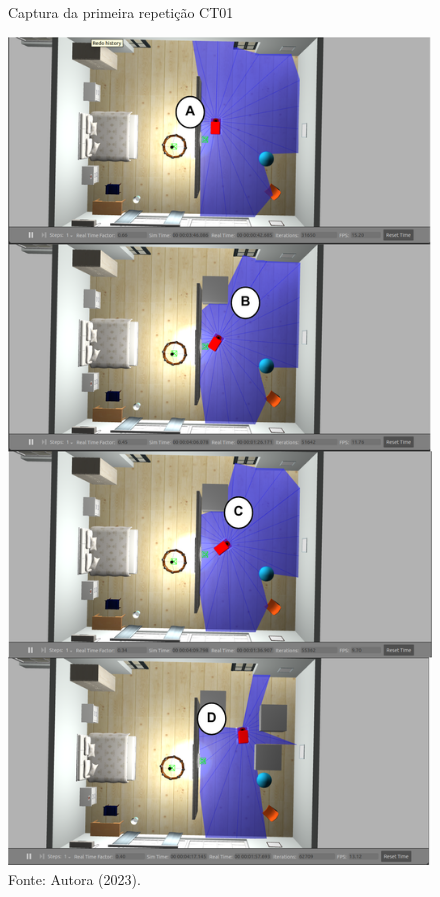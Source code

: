 \begin{figure}[H]
    \centering
    \caption{Captura da primeira repetição CT01}
    \includegraphics[scale=0.35]{ct01_1.png}
    \caption*{Fonte: Autora (2023).}
    \label{fig:teste1CT01}
\end{figure}

